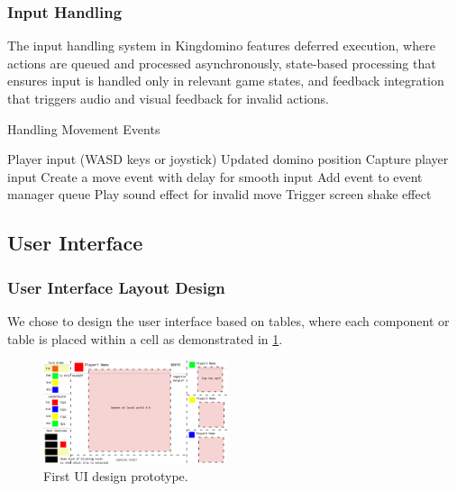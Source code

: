 \documentclass[conference]{IEEEtran}
\begin{document}

\subsubsection{Input Handling}
The input handling system in Kingdomino features deferred execution, where actions are queued and processed asynchronously, state-based processing that ensures input is handled only in relevant game states, and feedback integration that triggers audio and visual feedback for invalid actions.
\begin{algorithm}
    \caption{Handling Movement Events}
    \begin{algorithmic}
        \Require Player input (WASD keys or joystick)
        \Ensure Updated domino position
        \State Capture player input
            \State Create a move event with delay for smooth input
            \State Add event to event manager queue
            \State Play sound effect for invalid move
            \State Trigger screen shake effect
        \EndIf
    \end{algorithmic}
\end{algorithm}

\subsection{User Interface}

\subsubsection{User Interface Layout Design}

We chose to design the user interface based on tables, where each component or
table is placed within a cell as demonstrated in \ref{fig:ui-proto}.

\begin{figure}[htbp]
    \centerline{\includegraphics[width=0.48\textwidth]{assets/ui-prototype.png}}
    \caption{First UI design prototype.}\label{fig:ui-proto}
\end{figure}
\end{document}
